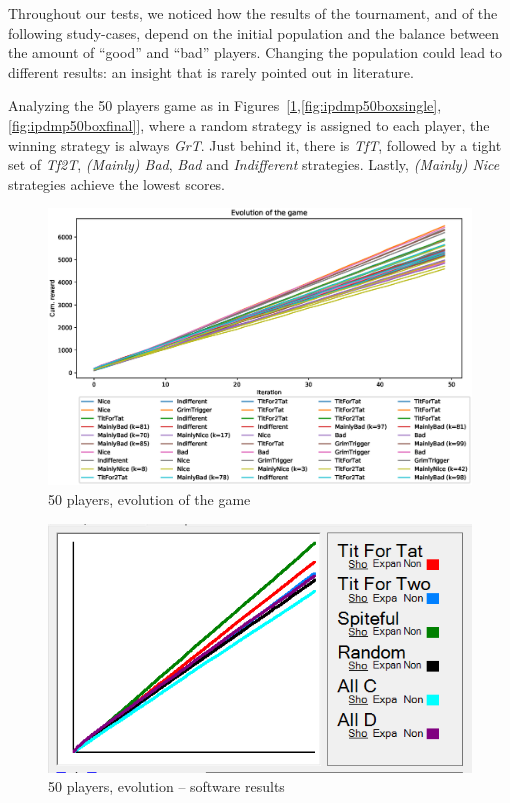 \documentclass[journal,10pt,twoside]{IEEEtran}
\begin{document}
Throughout our tests, we noticed how the results of the tournament, and of the following study-cases, depend on the initial population and the balance between the amount of ``good'' and ``bad'' players. Changing the population could lead to different results: an insight that is rarely pointed out in literature.

Analyzing the 50 players game as in Figures~[\ref{fig:ipdmp50evo},\ref{fig:ipdmp50boxsingle},\ref{fig:ipdmp50boxfinal}], where a random strategy is assigned to each player, the winning strategy is always \textit{GrT}. Just behind it, there is \textit{TfT}, followed by a tight set of \textit{Tf2T}, \textit{(Mainly) Bad}, \textit{Bad} and \textit{Indifferent} strategies. Lastly, \textit{(Mainly) Nice} strategies achieve the lowest scores.

\begin{figure}[!ht]
    \centering
    \includegraphics[width=1\columnwidth]{../img/ipdmp/ipdmp-evolution-of-game-50}
    \caption{50 players, evolution of the game}
    \label{fig:ipdmp50evo}
\end{figure}

\begin{figure}[!ht]
    \centering
    \includegraphics[width=.8\columnwidth]{../img/ipdmp/ipdmp50-plot-det}
    \caption{50 players, evolution -- software results \cite{demosw}}
    \label{fig:ipdmp50evosw}
\end{figure}
\end{document}
